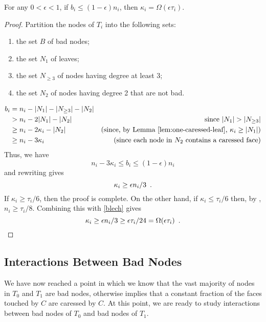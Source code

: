\documentclass{patmorin}
\begin{document}
\begin{lem}
   For any $0<\epsilon < 1$, if $b_i \le (1-\epsilon)n_i$, then
   $\kappa_i = \Omega(\epsilon\tau_i)$.
\end{lem}

\begin{proof}
   Partition the nodes of $T_i$ into the following sets:
   \begin{enumerate}
       \item the set $B$ of bad nodes;
       \item the set $N_1$ of leaves;
       \item the set $N_{\ge 3}$ of nodes having degree at least 3;
       \item the set $N_2$ of nodes having degree 2 that are not bad.
   \end{enumerate}
   \begin{align*}
     b_i & = n_i - |N_1|- |N_{\ge 3}|-|N_2| \\
	   & > n_i - 2|N_1|-|N_2| & \text{since $|N_1|> |N_{\ge 3}|$} \\
         & \ge  n_i - 2\kappa_i -|N_2| 
	   & \text{(since, by \lemref{one-caressed-leaf}, $\kappa_i\ge |N_1|$)} \\
           & \ge  n_i - 3\kappa_i 
           & \text{(since each node in $N_2$ contains a caressed face)}
    \end{align*}
    Thus, we have
    \[
          n_i-3\kappa_i \le b_i \le (1-\epsilon)n_i
    \]
    and rewriting gives 
    \begin{equation}
      \kappa_i \ge \epsilon n_i/3 \enspace . \eqlabel{blech}
    \end{equation}
    If $\kappa_i \ge \tau_i/6$, then the proof is complete.  On the other hand, if $\kappa_i \le \tau_i/6$ then, by , $n_i \ge \tau_i/8$. Combining this with \eqref{blech}  gives
    \[
      \kappa_i \ge \epsilon n_i/3 \ge \epsilon\tau_i/24 = \Omega(\epsilon \tau_i) \enspace . \qedhere
    \]
\end{proof}

\subsection{Interactions Between Bad Nodes}

We have now reached a point in which we know that the vast
majority of nodes in $T_0$ and $T_1$ are bad nodes, otherwise
 implies that a constant fraction of the
faces touched by $C$ are caressed by $C$.  At this point, we are ready
to study interactions between bad nodes of $T_0$ and bad nodes of $T_1$.
\end{document}

